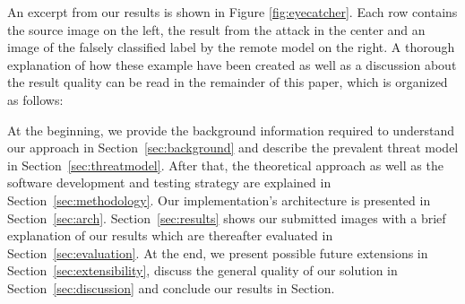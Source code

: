An excerpt from our results is shown in Figure \ref{fig:eyecatcher}. 
Each row contains the source image on the left, the result from the attack in the center and an image of the falsely classified label by the remote model on the right.
A thorough explanation of how these example have been created as well as a discussion about the result quality can be read in the remainder of this paper, which is organized as follows:

At the beginning, we provide the background information required to understand our approach in Section~\ref{sec:background} and describe the prevalent threat model in Section~\ref{sec:threatmodel}.
After that, the theoretical approach as well as the software development and testing strategy are explained in Section~\ref{sec:methodology}.
Our implementation's architecture is presented in Section~\ref{sec:arch}.
Section~\ref{sec:results} shows our submitted images with a brief explanation of our results which are thereafter evaluated in Section~\ref{sec:evaluation}.
At the end, we present possible future extensions in Section~\ref{sec:extensibility}, discuss the general quality of our solution in Section~\ref{sec:discussion} and conclude our results in Section.